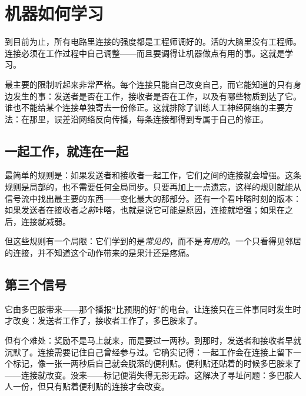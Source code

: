 \chapter{机器如何学习}

到目前为止，所有电路里连接的强度都是工程师调好的。活的大脑里没有工程师。连接必须在工作过程中自己调整——而且要调得让机器做点有用的事。这就是学习。

最主要的限制听起来非常严格。每个连接只能自己改变自己，而它能知道的只有身边发生的事：发送者是否在工作，接收者是否在工作，以及有哪些物质到达了它。谁也不能给某个连接单独寄去一份修正。这就排除了训练人工神经网络的主要方法：在那里，误差沿网络反向传播，每条连接都得到专属于自己的修正。

\section*{一起工作，就连在一起}

最简单的规则是：如果发送者和接收者一起工作，它们之间的连接就会增强。这条规则是局部的，也不需要任何全局同步。只要再加上一点遗忘，这样的规则就能从信号流中找出最主要的东西——变化最大的那部分。还有一个看咔嗒时刻的版本：如果发送者在接收者\emph{之前}咔嗒，也就是说它可能是原因，连接就增强；如果在之后，连接就减弱。

但这些规则有一个局限：它们学到的是\emph{常见的}，而不是\emph{有用的}。一个只看得见邻居的连接，并不知道这个动作带来的是果汁还是疼痛。

\section*{第三个信号}

它由多巴胺带来——那个播报“比预期的好”的电台。让连接只在三件事同时发生时才改变：发送者工作了，接收者工作了，多巴胺来了。


但有个难处：奖励不是马上就来，而是要过一两秒。到那时，发送者和接收者早就沉默了。连接需要记住自己曾经参与过。它确实记得：一起工作会在连接上留下一个标记，像一张一两秒后自己就会脱落的便利贴。便利贴还贴着的时候多巴胺来了——连接就改变。没来——标记便消失得无影无踪。这解决了寻址问题：多巴胺人人一份，但只有贴着便利贴的连接才会改变。

